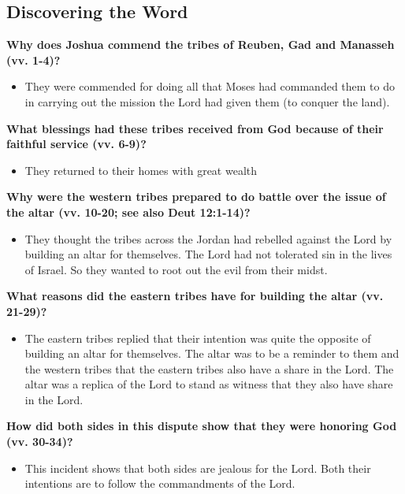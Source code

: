 \documentclass[11pt]{article}
\begin{document}
\subsection{Discovering the Word}
\label{sec:org2cf998c}

\textbf{\textbf{Why does Joshua commend the tribes of Reuben, Gad and Manasseh (vv. 1-4)?}}
\begin{itemize}
\item They were commended for doing all that Moses had commanded them to do in carrying out the mission the Lord had given them (to conquer the land).
\end{itemize}

\textbf{\textbf{What blessings had these tribes received from God because of their faithful service (vv. 6-9)?}}
\begin{itemize}
\item They returned to their homes with great wealth
\end{itemize}

\textbf{\textbf{Why were the western tribes prepared to do battle over the issue of the altar (vv. 10-20; see also Deut 12:1-14)?}}
\begin{itemize}
\item They thought the tribes across the Jordan had rebelled against the Lord by building an altar for themselves. The Lord had not tolerated sin in the lives of Israel. So they wanted to root out the evil from their midst.
\end{itemize}


\textbf{\textbf{What reasons did the eastern tribes have for building the altar (vv. 21-29)?}}
\begin{itemize}
\item The eastern tribes replied that their intention was quite the opposite of building an altar for themselves. The altar was to be a reminder to them and the western tribes that the eastern tribes also have a share in the Lord. The altar was a replica of the Lord to stand as witness that they also have share in the Lord.
\end{itemize}

\textbf{\textbf{How did both sides in this dispute show that they were honoring God (vv. 30-34)?}}
\begin{itemize}
\item This incident shows that both sides are jealous for the Lord. Both their intentions are to follow the commandments of the Lord.
\end{itemize}
\end{document}
